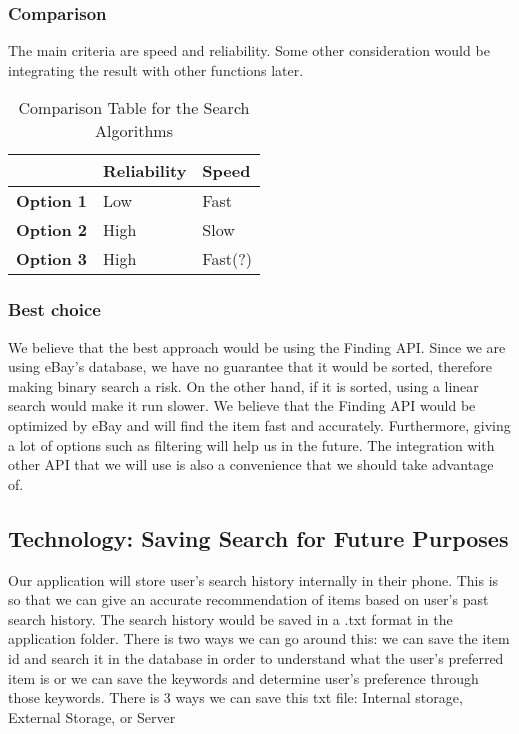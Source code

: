 \documentclass[journal,compsoc, 10pt, draftclsnofoot, onecolumn]{IEEEtran}
\begin{document}
\subsubsection{Comparison}
The main criteria are speed and reliability. Some other consideration would be
integrating the result with other functions later.

\begin{table}[h]
	\centering
	\caption{Comparison Table for the Search Algorithms}
	\label{Comparison Table for the Search Algorithm}
	\begin{tabularx}{\textwidth}{|X|X|X|}
		\hline
		\textbf{}         & \textbf{Reliability}                & \textbf{Speed} 
		\\ \hline
		\textbf{Option 1} & Low & Fast
		\\ \hline
\textbf{Option 2} & High & Slow		\\ \hline
\textbf{Option 3} & High &Fast(?)		\\ \hline
	\end{tabularx}
\end{table}

\subsubsection{Best choice}
We believe that the best approach would be using the Finding API. Since we are using
eBay's database, we have no guarantee that it would be sorted, therefore making
binary search a risk. On the other hand, if it is sorted, using a linear search would
make it run slower. We believe that the Finding API would be optimized by eBay and
will find the item fast and accurately. Furthermore, giving a lot of options such as
filtering will help us in the future. The integration with other API that we will use
is also a convenience that we should take advantage of.
  
\subsection{Technology: Saving Search for Future Purposes}
Our application will store user's search history internally in their phone. This is
so that we can give an accurate recommendation of items based on user's past search
history. The search history would be saved in a .txt format in the application
folder. There is two ways we can go around this: we can save the item id and search
it in the database in order to understand what the user's preferred item is or we can
save the keywords and determine user's preference through those keywords.
There is 3 ways we can save this txt file: Internal storage, External Storage, or
Server
\end{document}
